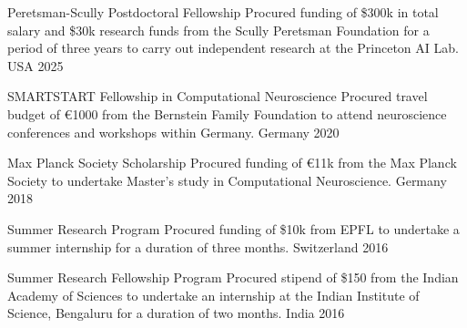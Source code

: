 
\begin{cvhonors}

    \cvhonor
    {Peretsman-Scully Postdoctoral Fellowship} %
    {Procured funding of \$300k in total salary and \$30k research funds from the Scully Peretsman Foundation for a period of three years to carry out independent research at the Princeton AI Lab.} %
    {USA} %
    {2025} %

    \cvhonor
    {SMARTSTART Fellowship in Computational Neuroscience} %
    {Procured travel budget of \euro{1000} from the Bernstein Family Foundation to attend neuroscience conferences and workshops within Germany.} %
    {Germany} %
    {2020} %
    
    \cvhonor
    {Max Planck Society Scholarship} %
    {Procured funding of \euro{11k} from the Max Planck Society to undertake Master's study in Computational Neuroscience.} %
    {Germany} %
    {2018} %

  \cvhonor
    {Summer Research Program} %
    {Procured funding of \$10k from EPFL to undertake a summer internship for a duration of three months. } %
    {Switzerland} %
    {2016} %

  \cvhonor
    {Summer Research Fellowship Program} %
    {Procured stipend of \$150 from the Indian Academy of Sciences to undertake an internship at the Indian Institute of Science, Bengaluru for a duration of two months.} %
    {India} %
    {2016} %

    \vspace{3mm}
\end{cvhonors}